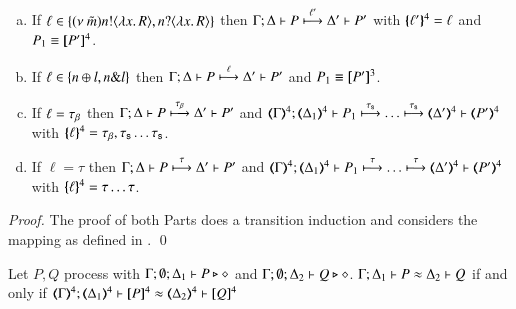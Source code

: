 \begin{proposition}
\begin{enumerate}
\begin{enumerate}[a)]
				\item	If $\ell \in \{(\nu\ \tilde{m}) n ! \langle \lambda x.\,R \rangle, n ? \langle \lambda x.\,R \rangle\}$
					then
					$\Gamma; \Delta \vdash P \stackrel{\ell'}{\longmapsto} \Delta' \vdash P'$
					with $\{\!\!\{\ell'\}\!\!\}^{4} = \ell$ and $P_1 \equiv [\!\![P']\!\!]^{4}$.

				\item	If $\ell \in \{n \oplus l, n \& l\}$
					then
					$\Gamma; \Delta \vdash P \stackrel{\ell}{\longmapsto} \Delta' \vdash P'$ and $P_1 \equiv [\!\![P']\!\!]^{3}$.

				\item	If $\ell = \tau_{\beta}$ then
					$\Gamma; \Delta \vdash P \stackrel{\tau_{\beta}}{\longmapsto} \Delta' \vdash P'$ and
					$\horel{\tmap{\Gamma}{4}}{\tmap{\Delta_1}{4}}{P_1}{\hby{\stau} \dots \hby{\stau}}
					{\tmap{\Delta'}{4}}{\tmap{P'}{4}}$ with $\{\!\!\{\ell\}\!\!\}^{4} = \tau_{\beta}, \tau_{\mathsf{s}} \dots \tau_{\mathsf{s}}$.

				\item	If $\ell = \tau$ then
					$\Gamma; \Delta \vdash P \stackrel{\tau}{\longmapsto} \Delta' \vdash P'$ and
					$\horel{\tmap{\Gamma}{4}}{\tmap{\Delta_1}{4}}{P_1}{\hby{\tau} \dots \hby{\tau}}
					{\tmap{\Delta'}{4}}{\tmap{P'}{4}}$ with $\{\!\!\{\ell\}\!\!\}^{4} = \tau \dots \tau$.
			\end{enumerate}
	\end{enumerate}
\end{proposition}

\begin{proof}
	The proof of both Parts does a transition induction and
	considers the mapping as defined in .
	\qed
\end{proof}


\begin{proposition}\rm
	\label{prop:fulla:pHOp_to_HOp}
	Let $P, Q$ \pHOp process with $\Gamma; \emptyset; \Delta_1 \vdash P \triangleright \diamond$ and 
	$\Gamma; \emptyset; \Delta_2 \vdash Q \triangleright \diamond$.
	$\Gamma; \Delta_1 \vdash P \approx \Delta_2 \vdash Q$ if and only if $\horel{\tmap{\Gamma}{4}}{\tmap{\Delta_1}{4}}{\pmap{P}{4}}{\wb}{\tmap{\Delta_2}{4}}{\pmap{Q}{4}}$
\end{proposition}

